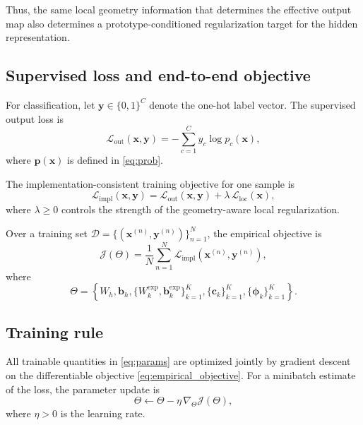 \documentclass{article}
\theoremstyle{definition}
\theoremstyle{remark}
\begin{document}
Thus, the same local geometry information that determines the effective output map also determines a prototype-conditioned regularization target for the hidden representation.

\subsection{Supervised loss and end-to-end objective}

For classification, let $\mathbf{y}\in\{0,1\}^C$ denote the one-hot label vector. The supervised output loss is
\begin{equation}
\mathcal{L}_{\mathrm{out}}(\mathbf{x},\mathbf{y})
=
-\sum_{c=1}^{C} y_c \log p_c(\mathbf{x}),
\label{eq:outloss}
\end{equation}
where $\mathbf{p}(\mathbf{x})$ is defined in \eqref{eq:prob}.

The implementation-consistent training objective for one sample is
\begin{equation}
\mathcal{L}_{\mathrm{impl}}(\mathbf{x},\mathbf{y})
=
\mathcal{L}_{\mathrm{out}}(\mathbf{x},\mathbf{y})
+
\lambda\,\mathcal{L}_{\mathrm{loc}}(\mathbf{x}),
\label{eq:totalloss}
\end{equation}
where $\lambda\ge 0$ controls the strength of the geometry-aware local regularization.

Over a training set $\mathcal{D}=\{(\mathbf{x}^{(n)},\mathbf{y}^{(n)})\}_{n=1}^{N}$, the empirical objective is
\begin{equation}
\mathcal{J}(\Theta)
=
\frac{1}{N}\sum_{n=1}^{N}
\mathcal{L}_{\mathrm{impl}}(\mathbf{x}^{(n)},\mathbf{y}^{(n)}),
\label{eq:empirical_objective}
\end{equation}
where
\begin{equation}
\Theta=
\left\{
W_h,\mathbf{b}_h,\{W_k^{\mathrm{exp}},\mathbf{b}_k^{\mathrm{exp}}\}_{k=1}^{K},
\{\mathbf{c}_k\}_{k=1}^{K},
\{\boldsymbol{\phi}_k\}_{k=1}^{K}
\right\}.
\label{eq:params}
\end{equation}

\subsection{Training rule}

All trainable quantities in \eqref{eq:params} are optimized jointly by gradient descent on the differentiable objective \eqref{eq:empirical_objective}. For a minibatch estimate of the loss, the parameter update is
\begin{equation}
\Theta
\leftarrow
\Theta-\eta\,\nabla_{\Theta}\mathcal{J}(\Theta),
\label{eq:update}
\end{equation}
where $\eta>0$ is the learning rate.
\end{document}

